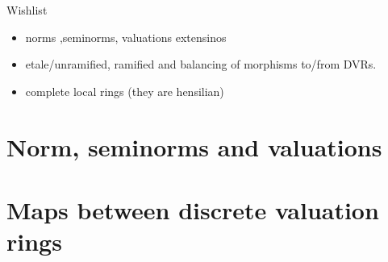 
Wishlist
\begin{itemize}
	\item norms ,seminorms, valuations extensinos
	\item etale/unramified, ramified and  balancing of morphisms to/from DVRs. 
	\item complete local rings (they are hensilian)
\end{itemize}

\section{Norm, seminorms and valuations} \label{sec:norm,_seminorms_and_valuations}

\section{Maps between discrete valuation rings} \label{sec:maps_between_discrete_valuation_rings}


